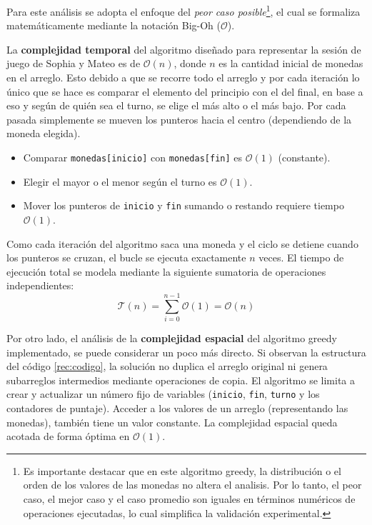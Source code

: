 Para este análisis se adopta el enfoque del \textit{peor caso posible}\footnote{Es importante destacar que en este algoritmo greedy, la distribución o el orden de los valores de las monedas no altera el analisis. Por lo tanto, el peor caso, el mejor caso y el caso promedio son iguales en términos numéricos de operaciones ejecutadas, lo cual simplifica la validación experimental.}, el cual se formaliza matemáticamente mediante la notación Big-Oh ($\mathcal{O}$).

La \textbf{complejidad temporal} del algoritmo diseñado para representar la sesión de juego de Sophia y Mateo es de $\mathcal{O}(n)$, donde $n$ es la cantidad inicial de monedas en el arreglo. Esto debido a que se recorre todo el arreglo y por cada iteración lo único que se hace es comparar el elemento del principio con el del final, en base a eso y según de quién sea el turno, se elige el más alto o el más bajo. Por cada pasada simplemente se mueven los punteros hacia el centro (dependiendo de la moneda elegida).

\begin{itemize}
    \item Comparar \verb|monedas[inicio]| con \verb|monedas[fin]| es $\mathcal{O}(1)$ (constante).
    \item Elegir el mayor o el menor según el turno es $\mathcal{O}(1)$.
    \item Mover los punteros de \verb|inicio| y \verb|fin| sumando o restando requiere tiempo $\mathcal{O}(1)$.
\end{itemize}


Como cada iteración del algoritmo saca una moneda y el ciclo se detiene cuando los punteros se cruzan, el bucle se ejecuta exactamente $n$ veces. El tiempo de ejecución total se modela mediante la siguiente sumatoria de operaciones independientes:
\begin{equation*} 
    \mathcal{T}(n) = \sum_{i=0}^{n-1} \mathcal{O}(1) = \mathcal{O}(n)
\end{equation*}

Por otro lado, el análisis de la \textbf{complejidad espacial} del algoritmo greedy implementado, se puede considerar un poco más directo. Si observan la estructura del código \ref{rec:codigo}, la solución no duplica el arreglo original ni genera subarreglos intermedios mediante operaciones de copia. El algoritmo se limita a crear y actualizar un número fijo de variables (\verb|inicio|, \verb|fin|, \verb|turno| y los contadores de puntaje). Acceder a los valores de un arreglo (representando las monedas), también tiene un valor constante.
La complejidad espacial queda acotada de forma óptima en $\mathcal{O}(1)$.

